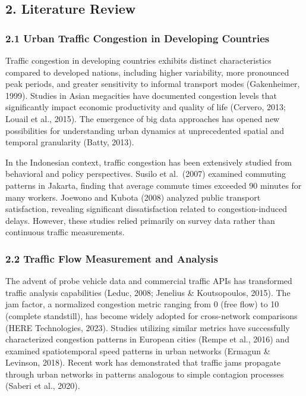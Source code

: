 \documentclass[
  12pt,
]{article}
\begin{document}
\subsection{2. Literature Review}\label{literature-review}

\subsubsection{2.1 Urban Traffic Congestion in Developing Countries}\label{urban-traffic-congestion-in-developing-countries}

Traffic congestion in developing countries exhibits distinct characteristics compared to developed nations, including higher variability, more pronounced peak periods, and greater sensitivity to informal transport modes (Gakenheimer, 1999). Studies in Asian megacities have documented congestion levels that significantly impact economic productivity and quality of life (Cervero, 2013; Louail et al., 2015). The emergence of big data approaches has opened new possibilities for understanding urban dynamics at unprecedented spatial and temporal granularity (Batty, 2013).

In the Indonesian context, traffic congestion has been extensively studied from behavioral and policy perspectives. Susilo et al.~(2007) examined commuting patterns in Jakarta, finding that average commute times exceeded 90 minutes for many workers. Joewono and Kubota (2008) analyzed public transport satisfaction, revealing significant dissatisfaction related to congestion-induced delays. However, these studies relied primarily on survey data rather than continuous traffic measurements.

\subsubsection{2.2 Traffic Flow Measurement and Analysis}\label{traffic-flow-measurement-and-analysis}

The advent of probe vehicle data and commercial traffic APIs has transformed traffic analysis capabilities (Leduc, 2008; Jenelius \& Koutsopoulos, 2015). The jam factor, a normalized congestion metric ranging from 0 (free flow) to 10 (complete standstill), has become widely adopted for cross-network comparisons (HERE Technologies, 2023). Studies utilizing similar metrics have successfully characterized congestion patterns in European cities (Rempe et al., 2016) and examined spatiotemporal speed patterns in urban networks (Ermagun \& Levinson, 2018). Recent work has demonstrated that traffic jams propagate through urban networks in patterns analogous to simple contagion processes (Saberi et al., 2020).
\end{document}
